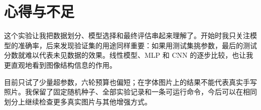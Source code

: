 \documentclass[11pt,a4paper]{ctexart}
\begin{document}
\section{心得与不足}
这个实验让我把数据划分、模型选择和最终评估串起来理解了。开始时我只关注模型的准确率，后来发现验证集的用途同样重要：如果用测试集挑参数，最后的测试分数就难以代表未见数据的效果。线性模型、MLP 和 CNN 的逐步比较，也让我更直观地看到图像结构信息的作用。

目前只试了少量超参数，六轮预算也偏短；在字体图片上的结果不能代表真实手写照片。我保留了固定随机种子、全部实验记录和一条可运行命令，今后可以在相同划分上继续检查更多真实图片与其他增强方式。
\end{document}
